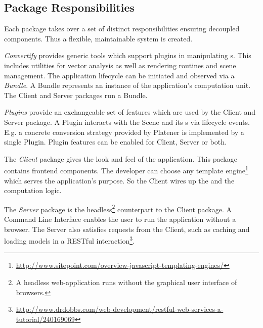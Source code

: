 \documentclass[../ClassicThesis.tex]{subfiles}
\begin{document}
\subsection{Package Responsibilities}

Each package takes over a set of distinct responsibilities ensuring decoupled
components. Thus a flexible, maintainable system is created.

\emph{Convertify} provides generic tools which support plugins in manipulating
{\threedmodel}s. This includes utilities for vector analysis as well as
rendering routines and scene management. The application lifecycle can be
initiated and observed via a \emph{Bundle}. A Bundle represents an instance of
the application's computation unit. The Client and Server packages run a Bundle.

\emph{Plugins} provide an exchangeable set of features which are used by the
Client and Server package. A Plugin interacts with the Scene and its
{\threedmodel}s via lifecycle events. E.g. a concrete conversion strategy
provided by Platener is implemented by a single Plugin. Plugin features can be
enabled for Client, Server or both.

The \emph{Client} package gives the look and feel of the application. This
package contains frontend components. The developer can choose any template
engine\footnote{\url{http://www.sitepoint.com/overview-javascript-templating-engines/}}
which serves the application's purpose. So the Client wires up the
{\userinterface} and the computation logic.

The \emph{Server} package is the headless\footnote{A headless web-application
  runs without the graphical user interface of browsers.} counterpart to the
Client package. A Command Line Interface enables the user to run the application
without a browser. The Server also satisfies requests from the Client, such as
caching and loading models in a RESTful
interaction\footnote{\url{http://www.drdobbs.com/web-development/restful-web-services-a-tutorial/240169069}}.

\end{document}
